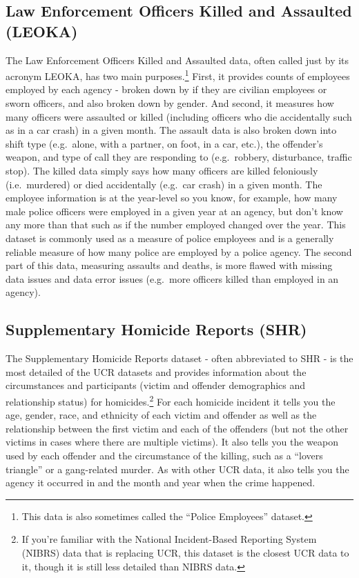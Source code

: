 \documentclass[
  12pt,
  openany]{book}
\begin{document}
\hypertarget{law-enforcement-officers-killed-and-assaulted-leoka}{%
\subsection{Law Enforcement Officers Killed and Assaulted (LEOKA)}\label{law-enforcement-officers-killed-and-assaulted-leoka}}

The Law Enforcement Officers Killed and Assaulted data, often called just by its acronym LEOKA, has two main purposes.\footnote{This data is also sometimes called the ``Police Employees'' dataset.} First, it provides counts of employees employed by each agency - broken down by if they are civilian employees or sworn officers, and also broken down by gender. And second, it measures how many officers were assaulted or killed (including officers who die accidentally such as in a car crash) in a given month. The assault data is also broken down into shift type (e.g.~alone, with a partner, on foot, in a car, etc.), the offender's weapon, and type of call they are responding to (e.g.~robbery, disturbance, traffic stop). The killed data simply says how many officers are killed feloniously (i.e.~murdered) or died accidentally (e.g.~car crash) in a given month. The employee information is at the year-level so you know, for example, how many male police officers were employed in a given year at an agency, but don't know any more than that such as if the number employed changed over the year. This dataset is commonly used as a measure of police employees and is a generally reliable measure of how many police are employed by a police agency. The second part of this data, measuring assaults and deaths, is more flawed with missing data issues and data error issues (e.g.~more officers killed than employed in an agency).

\hypertarget{supplementary-homicide-reports-shr}{%
\subsection{Supplementary Homicide Reports (SHR)}\label{supplementary-homicide-reports-shr}}

The Supplementary Homicide Reports dataset - often abbreviated to SHR - is the most detailed of the UCR datasets and provides information about the circumstances and participants (victim and offender demographics and relationship status) for homicides.\footnote{If you're familiar with the National Incident-Based Reporting System (NIBRS) data that is replacing UCR, this dataset is the closest UCR data to it, though it is still less detailed than NIBRS data.} For each homicide incident it tells you the age, gender, race, and ethnicity of each victim and offender as well as the relationship between the first victim and each of the offenders (but not the other victims in cases where there are multiple victims). It also tells you the weapon used by each offender and the circumstance of the killing, such as a ``lovers triangle'' or a gang-related murder. As with other UCR data, it also tells you the agency it occurred in and the month and year when the crime happened.
\end{document}
